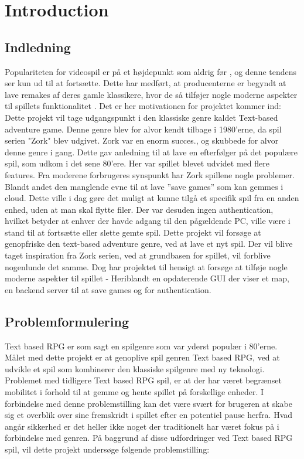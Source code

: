 \section{Introduction}
\subsection{Indledning}

Populariteten for videospil er på et højdepunkt som aldrig før \cite{WE-PC}, og denne tendens ser kun ud til at fortsætte. Dette har medført, at producenterne er begyndt at lave remakes af deres gamle klassikere, hvor de så tilføjer nogle moderne aspekter til spillets funktionalitet \cite{Protocol}. Det er her motivationen for projektet kommer ind: \\

Dette projekt vil tage udgangspunkt i den klassiske genre kaldet Text-based adventure game. Denne genre blev for alvor kendt tilbage i 1980'erne, da spil serien "Zork" blev udgivet. Zork var en enorm succes\cite{WikiZork}., og skubbede for alvor denne genre i gang. 
Dette gav anledning til at lave en efterfølger på det populære spil, som udkom i det sene 80’ere. Her var spillet blevet udvidet med flere features.
Fra moderene forbrugeres synspunkt har Zork spillene nogle problemer. Blandt andet den manglende evne til at lave ”save games” som kan gemmes i cloud. Dette ville i dag gøre det muligt at kunne tilgå et specifik spil fra en anden enhed, uden at man skal flytte filer. Der var desuden ingen authentication, hvilket betyder at enhver der havde adgang til den pågældende PC, ville være i stand til at fortsætte eller slette gemte spil. 
Dette projekt vil forsøge at genopfriske den text-based adventure genre, ved at lave et nyt spil. Der vil blive taget inspiration fra Zork serien, ved at grundbasen for spillet, vil forblive nogenlunde det samme. Dog har projektet til hensigt at forsøge at tilføje nogle moderne aspekter til spillet - Heriblandt en opdaterende GUI der viser et map, en backend server til at save games og for authentication.




\subsection{Problemformulering}
Text based RPG er som sagt en spilgenre som var yderst populær i 80’erne. Målet med dette projekt er at genoplive spil genren Text based RPG, ved at udvikle et spil som kombinerer den klassiske spilgenre med ny teknologi. Problemet med tidligere Text based RPG spil, er at der har været begrænset mobilitet i forhold til at gemme og hente spillet på forskellige enheder. I forbindelse med denne problemstilling kan det være svært for brugeren at skabe sig et overblik over sine fremskridt i spillet efter en potentiel pause herfra. Hvad angår sikkerhed er det heller ikke noget der traditionelt har været fokus på i forbindelse med genren. På baggrund af disse udfordringer ved Text based RPG spil, vil dette projekt undersøge følgende problemstilling: \\

